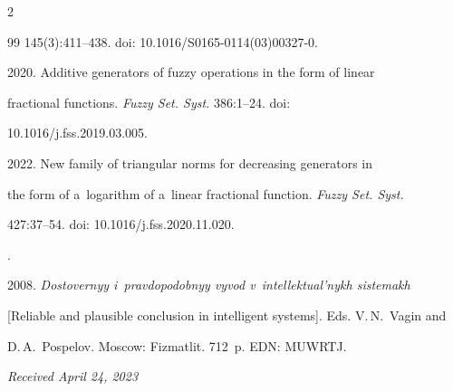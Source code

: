 \begin{multicols}{2}
{{\begin{thebibliography}{99}
145(3):411--438. doi: 10.1016/S0165-0114(03)00327-0.







 2020. Additive generators of fuzzy operations in the form of linear 


fractional functions. \textit{Fuzzy Set. Syst.} 386:1--24. doi: 


10.1016/j.fss.2019.03.005.




 2022. New family of triangular norms for decreasing generators in 


the form of a~logarithm of a~linear fractional function. \textit{Fuzzy Set. Syst.} 


427:37--54. doi: 10.1016/j.fss.2020.11.020.







. 


2008. \textit{Dostovernyy i~pravdopodobnyy vyvod v~intellektual'nykh sistemakh} 


[Reliable and plausible conclusion in intelligent systems]. Eds. V.\,N.~Vagin and 


D.\,A.~Pospelov. Moscow: Fizmatlit. 712~p. EDN: MUWRTJ.





\end{thebibliography}





 }


 }





\end{multicols}





\vspace*{-6pt}





\hfill{\small\textit{Received April 24, 2023}} 





\vspace*{-18pt}


